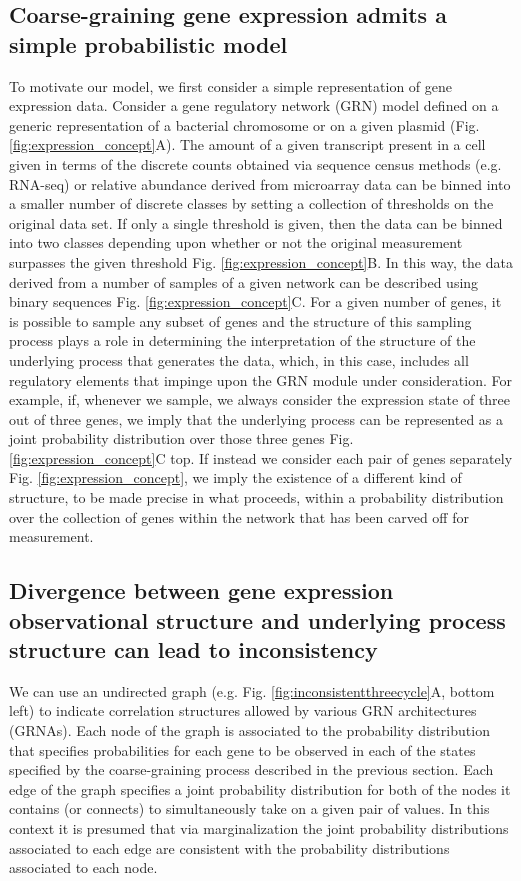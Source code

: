 \subsection*{Coarse-graining gene expression admits a simple probabilistic model}
To motivate our model, we first consider a simple representation of gene expression data. Consider a gene regulatory network (GRN) model defined on a generic representation of a bacterial chromosome or on a given plasmid (Fig. \ref{fig:expression_concept}A). The amount of a given transcript present in a cell given in terms of the discrete counts obtained via sequence census methods (e.g. RNA-seq) or relative abundance derived from microarray data can be binned into a smaller number of discrete classes by setting a collection of thresholds on the original data set. If only a single threshold is given, then the data can be binned into two classes depending upon whether or not the original measurement surpasses the given threshold Fig. \ref{fig:expression_concept}B. In this way, the data derived from a number of samples of a given network can be described using binary sequences Fig. \ref{fig:expression_concept}C. For a given number of genes, it is possible to sample any subset of genes and the structure of this sampling process plays a role in determining the interpretation of the structure of the underlying process that generates the data, which, in this case, includes all regulatory elements that impinge upon the GRN module under consideration. For example, if, whenever we sample, we always consider the expression state of three out of three genes, we imply that the underlying process can be represented as a joint probability distribution over those three genes Fig. \ref{fig:expression_concept}C top. If instead we consider each pair of genes separately Fig. \ref{fig:expression_concept}, we imply the existence of a different kind of structure, to be made precise in what proceeds, within a probability distribution over the collection of genes within the network that has been carved off for measurement.

\subsection*{Divergence between gene expression observational structure and underlying process structure can lead to inconsistency}
We can use an undirected graph (e.g. Fig. \ref{fig:inconsistentthreecycle}A, bottom left) to indicate correlation structures allowed by various GRN architectures (GRNAs). Each node of the graph is associated to the probability distribution that specifies probabilities for each gene to be observed in each of the states specified by the coarse-graining process described in the previous section. Each edge of the graph specifies a joint probability distribution for both of the nodes it contains (or connects) to simultaneously take on a given pair of values. In this context it is presumed that via marginalization the joint probability distributions associated to each edge are consistent with the probability distributions associated to each node.

